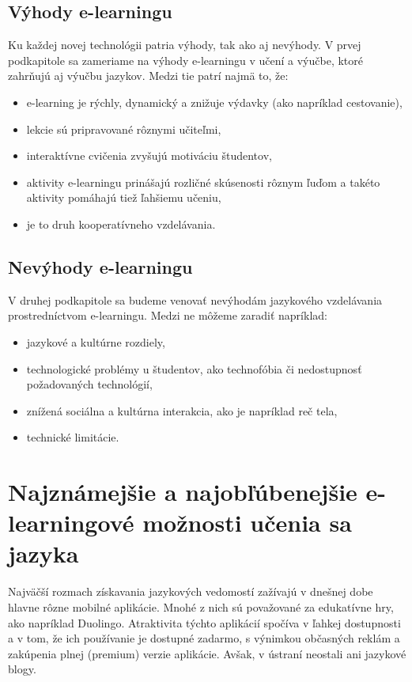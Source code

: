 \documentclass[10pt,oneside,slovak,a4paper]{article}
\begin{document}
\subsection{Výhody e-learningu}%
Ku každej novej technológii patria výhody, tak ako aj nevýhody. V prvej podkapitole sa zameriame na výhody e-learningu v učení a výučbe, ktoré zahrňujú aj výučbu jazykov. Medzi tie patrí najmä to, že:
\begin{itemize}
\item e-learning je rýchly, dynamický a znižuje výdavky (ako napríklad cestovanie), \cite{efektivnost}
\item lekcie sú pripravované rôznymi učiteľmi, \cite{efektivnost}
\item interaktívne cvičenia zvyšujú motiváciu študentov, \cite{vyhody}
\item aktivity e-learningu prinášajú rozličné skúsenosti rôznym ľuďom a takéto aktivity pomáhajú tiež ľahšiemu učeniu, \cite{vyhody}
\item je to druh kooperatívneho vzdelávania. \cite{efektivnost}
\end{itemize}

\subsection{Nevýhody e-learningu}%
V druhej podkapitole sa budeme venovať nevýhodám jazykového vzdelávania prostredníctvom e-learningu. Medzi ne môžeme zaradiť napríklad:

\begin{itemize}
\item jazykové a kultúrne rozdiely, \cite{efektivnost}
\item technologické problémy u študentov, ako technofóbia či  nedostupnosť požadovaných technológií, \cite{nevyhody}
\item znížená sociálna a kultúrna interakcia, ako je napríklad reč tela, \cite{nevyhody}
\item technické limitácie.\cite{efektivnost}
\end{itemize}

\section{Najznámejšie a najobľúbenejšie e-learningové možnosti učenia sa jazyka}%
Najväčší rozmach získavania jazykových vedomostí zažívajú v dnešnej dobe hlavne rôzne mobilné aplikácie. Mnohé z nich sú považované za edukatívne hry, ako napríklad Duolingo. Atraktivita týchto aplikácií spočíva v ľahkej dostupnosti a v tom, že ich používanie je dostupné zadarmo, s výnimkou občasných reklám a zakúpenia plnej (premium) verzie aplikácie. Avšak, v ústraní neostali ani jazykové blogy.
\end{document}
